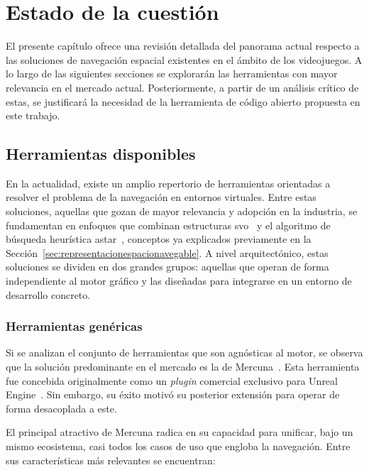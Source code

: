 \chapter{Estado de la cuestión}

El presente capítulo ofrece una revisión detallada del panorama actual respecto a las soluciones de navegación espacial existentes en el ámbito de los videojuegos.
A lo largo de las siguientes secciones se explorarán las herramientas con mayor relevancia en el mercado actual.
Posteriormente, a partir de un análisis crítico de estas, se justificará la necesidad de la herramienta de código abierto propuesta en este trabajo. 

\section{Herramientas disponibles}

En la actualidad, existe un amplio repertorio de herramientas orientadas a resolver el problema de la navegación en entornos virtuales.
Entre estas soluciones, aquellas que gozan de mayor relevancia y adopción en la industria, se fundamentan en enfoques que combinan estructuras \acrshort{svo}~\cite{Brewer2015NavMesh} y el algoritmo de búsqueda heurística \gls{astar}~\cite{Millington}, conceptos ya explicados previamente en la Sección~\ref{sec:representacionespacionavegable}.
A nivel arquitectónico, estas soluciones se dividen en dos grandes grupos: aquellas que operan de forma independiente al motor gráfico y las diseñadas para integrarse en un entorno de desarrollo concreto.

\subsection{Herramientas genéricas}

Si se analizan el conjunto de herramientas que son agnósticas al motor, se observa que la solución predominante en el mercado es la de Mercuna~\cite{Mercuna}.
Esta herramienta fue concebida originalmente como un \textit{plugin} comercial exclusivo para Unreal Engine~\cite{unreal}.
Sin embargo, su éxito motivó su posterior extensión para operar de forma desacoplada a este.

El principal atractivo de Mercuna radica en su capacidad para unificar, bajo un mismo ecosistema, casi todos los casos de uso que engloba la navegación.
Entre sus características más relevantes se encuentran:

